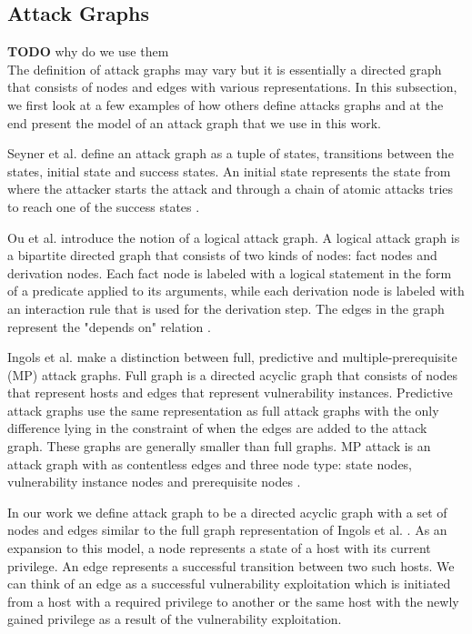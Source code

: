\subsection{Attack Graphs}
\label{chap:attack_graphs}
\textbf{TODO}  why do we use them\\

The definition of attack graphs may vary but it is essentially a directed graph that consists of nodes and edges with various representations. In this subsection, we first look at a few examples of how others define attacks graphs and at the end present the model of an attack graph that we use in this work.

Seyner et al. define an attack graph as a tuple of states, transitions between the states, initial state and success states. An initial state represents the state from where the attacker starts the attack and through a chain of atomic attacks tries to reach one of the success states \cite{sheyner2002automated}.

Ou et al. introduce the notion of a logical attack graph. A logical attack graph is a bipartite directed graph that consists of two kinds of nodes: fact nodes and derivation nodes. Each fact node is labeled with a logical statement in the form of a predicate applied to its arguments, while each derivation node is labeled with an interaction rule that is used for the derivation step. The edges in the graph represent the "depends on" relation \cite{ou2006scalable}.

Ingols et al. make a distinction between full, predictive and multiple-prerequisite (MP) attack graphs. Full graph is a directed acyclic graph that consists of nodes that represent hosts and edges that represent vulnerability instances. Predictive attack graphs use the same representation as full attack graphs with the only difference lying in the constraint of when the edges are added to the attack graph. These graphs are generally smaller than full graphs. MP attack is an attack graph with as contentless edges and three node type: state nodes, vulnerability instance nodes and prerequisite nodes \cite{ingols2006practical}.

In our work we define attack graph to be a directed acyclic graph with a set of nodes and edges similar to the full graph representation of Ingols et al. \cite{ingols2006practical}. As an expansion to this model, a node represents a state of a host with its current privilege. An edge represents a successful transition between two such hosts. We can think of an edge as a successful vulnerability exploitation which is initiated from a host with a required privilege to another or the same host with the newly gained privilege as a result of the vulnerability exploitation.